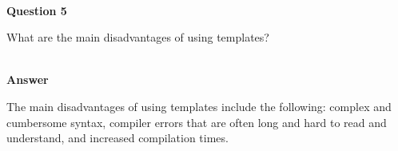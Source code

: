 \hspace*{\fill} \\ %
\noindent
\textbf{Question 5}

What are the main disadvantages of using templates?

\hspace*{\fill} \\ %
\noindent
\textbf{Answer}

The main disadvantages of using templates include the following: complex and cumbersome syntax, compiler errors that are often long and hard to read and understand, and increased compilation times.



